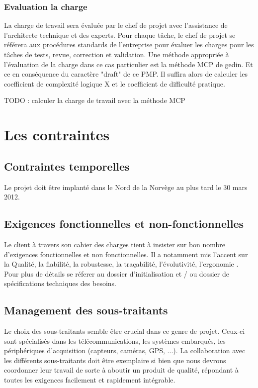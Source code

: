 \subsubsection{Evaluation la charge}
La charge de travail sera évaluée par le chef de projet avec l'assistance de l'architecte technique et des experts.
Pour chaque tâche, le chef de projet se référera aux procédures standards de l'entreprise pour évaluer les charges pour les tâches de tests, revue, correction et validation.
Une méthode appropriée à l'évaluation de la charge dans ce cas particulier est la méthode MCP de gedin. Et ce en conséquence du caractère "draft" de ce PMP.
Il suffira alors de calculer les coefficient de complexité logique X et le coefficient de difficulté pratique.

TODO : calculer la charge de travail avec la méthode MCP


\section{Les contraintes}
\subsection{Contraintes temporelles}
Le projet doit être implanté dans le Nord de la Norvège au plus tard le 30 mars 2012.

\subsection{Exigences fonctionnelles et non-fonctionnelles}
Le client à travers son cahier des charges tient à insister sur bon nombre d'exigences fonctionnelles et non fonctionnelles. Il a notamment mis
l'accent sur la Qualité, la fiabilité,
la robustesse, la traçabilité, l'évolutivité, l'ergonomie . Pour plus de détails se réferer au dossier d'initialisation et / ou dossier de spécifications techniques des besoins.

\subsection{Management des sous-traitants}
Le choix des sous-traitants semble être crucial dans ce genre de projet. Ceux-ci sont spécialisés dans les
télécommunications, les systèmes embarqués, les périphériques d’acquisition (capteurs,
caméras, GPS, ...). La collaboration avec les différents sous-traitants doit être exemplaire si bien que nous devrons coordonner leur travail de sorte à aboutir un produit de qualité, répondant à toutes les exigences facilement et rapidement intégrable.

